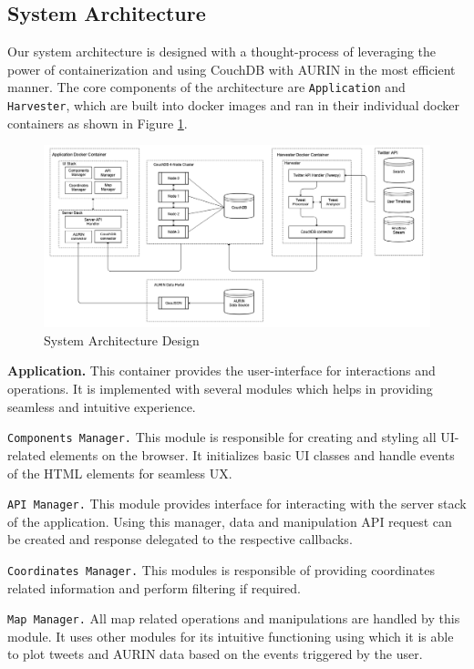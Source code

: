 \subsection{System Architecture}
Our system architecture is designed with a thought-process of leveraging the power of containerization and using CouchDB with AURIN in the most efficient manner. The core components of the architecture are \texttt{Application} and \texttt{Harvester}, which are built into docker images and ran in their individual docker containers as shown in Figure \ref{fig:sysarchitecture}.

\begin{figure}[H]
    \centering
    \includegraphics[width=16cm,keepaspectratio=true]{images/cloud_assignment_architecture.png}
    \caption{System Architecture Design}
    \label{fig:sysarchitecture}
\end{figure}

\textbf{Application.} This container provides the user-interface for interactions and operations. It is implemented with several modules which helps in providing seamless and intuitive experience.

\texttt{Components Manager.} This module is responsible for creating and styling all UI-related elements on the browser. It initializes basic UI classes and handle events of the HTML elements for seamless UX.

\texttt{API Manager.} This module provides interface for interacting with the server stack of the application. Using this manager, data and manipulation API request can be created and response delegated to the respective callbacks.

\texttt{Coordinates Manager.} This modules is responsible of providing coordinates related information and perform filtering if required.

\texttt{Map Manager.} All map related operations and manipulations are handled by this module. It uses other modules for its intuitive functioning using which it is able to plot tweets and AURIN data based on the events triggered by the user.

